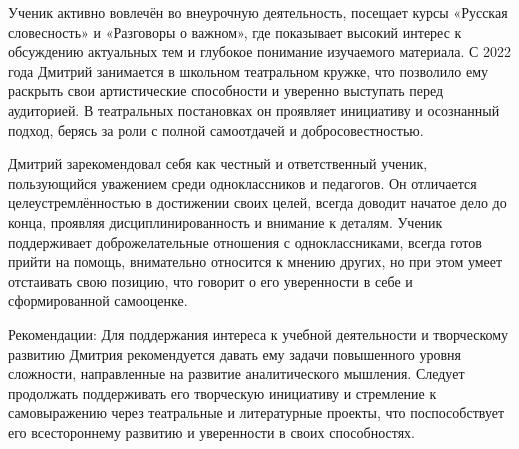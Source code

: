 \documentclass[a4paper,12pt]{article}
\begin{document}
Ученик активно вовлечён во внеурочную деятельность, посещает курсы «Русская словесность» и «Разговоры о важном», где показывает высокий интерес к обсуждению актуальных тем и глубокое понимание изучаемого материала. С 2022 года Дмитрий занимается в школьном театральном кружке, что позволило ему раскрыть свои артистические способности и уверенно выступать перед аудиторией. В театральных постановках он проявляет инициативу и осознанный подход, берясь за роли с полной самоотдачей и добросовестностью.

Дмитрий зарекомендовал себя как честный и ответственный ученик, пользующийся уважением среди одноклассников и педагогов. Он отличается целеустремлённостью в достижении своих целей, всегда доводит начатое дело до конца, проявляя дисциплинированность и внимание к деталям. Ученик поддерживает доброжелательные отношения с одноклассниками, всегда готов прийти на помощь, внимательно относится к мнению других, но при этом умеет отстаивать свою позицию, что говорит о его уверенности в себе и сформированной самооценке.

Рекомендации: Для поддержания интереса к учебной деятельности и творческому развитию Дмитрия рекомендуется давать ему задачи повышенного уровня сложности, направленные на развитие аналитического мышления. Следует продолжать поддерживать его творческую инициативу и стремление к самовыражению через театральные и литературные проекты, что поспособствует его всестороннему развитию и уверенности в своих способностях.
\end{document}
